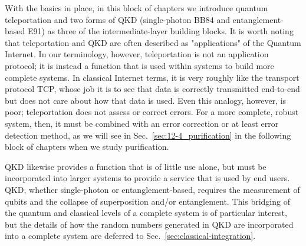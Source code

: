 
\begin{partintro}
With the basics in place, in this block of chapters we introduce quantum teleportation and two forms of QKD (single-photon BB84 and entanglement-based E91) as three of the intermediate-layer building blocks.  It is worth noting that teleportation and QKD are often described as "applications" of the Quantum Internet. In our terminology, however, teleportation is not an application protocol; it is instead a function that is used within systems to build more complete systems. In classical Internet terms, it is very roughly like the transport protocol TCP, whose job it is to see that data is correctly transmitted end-to-end but does not care about how that data is used. Even this analogy, however, is poor; teleportation does not assess or correct errors. For a more complete, robust system, then, it must be combined with an error correction or at least error detection method, as we will see in Sec.~\ref{sec:12-4_purification} in the following block of chapters when we study purification.

QKD likewise provides a function that is of little use alone, but must be incorporated into larger systems to provide a service that is used by end users. QKD, whether single-photon or entanglement-based, requires the measurement of qubits and the collapse of superposition and/or entanglement. This bridging of the quantum and classical levels of a complete system is of particular interest, but the details of how the random numbers generated in QKD are incorporated into a complete system are deferred to Sec.~\ref{sec:classical-integration}.
\end{partintro}
